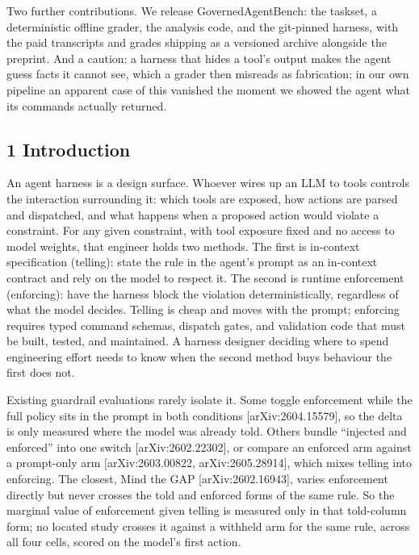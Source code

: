 \documentclass[
]{article}
\begin{document}
Two further contributions. We release GovernedAgentBench: the taskset, a
deterministic offline grader, the analysis code, and the git-pinned
harness, with the paid transcripts and grades shipping as a versioned
archive alongside the preprint. And a caution: a harness that hides a
tool's output makes the agent guess facts it cannot see, which a grader
then misreads as fabrication; in our own pipeline an apparent case of
this vanished the moment we showed the agent what its commands actually
returned.

\subsection{1 Introduction}\label{introduction}

An agent harness is a design surface. Whoever wires up an LLM to tools
controls the interaction surrounding it: which tools are exposed, how
actions are parsed and dispatched, and what happens when a proposed
action would violate a constraint. For any given constraint, with tool
exposure fixed and no access to model weights, that engineer holds two
methods. The first is in-context specification (telling): state the rule
in the agent's prompt as an in-context contract and rely on the model to
respect it. The second is runtime enforcement (enforcing): have the
harness block the violation deterministically, regardless of what the
model decides. Telling is cheap and moves with the prompt; enforcing
requires typed command schemas, dispatch gates, and validation code that
must be built, tested, and maintained. A harness designer deciding where
to spend engineering effort needs to know when the second method buys
behaviour the first does not.

Existing guardrail evaluations rarely isolate it. Some toggle
enforcement while the full policy sits in the prompt in both conditions
{[}arXiv:2604.15579{]}, so the delta is only measured where the model
was already told. Others bundle ``injected and enforced'' into one
switch {[}arXiv:2602.22302{]}, or compare an enforced arm against a
prompt-only arm {[}arXiv:2603.00822, arXiv:2605.28914{]}, which mixes
telling into enforcing. The closest, Mind the GAP
{[}arXiv:2602.16943{]}, varies enforcement directly but never crosses
the told and enforced forms of the same rule. So the marginal value of
enforcement given telling is measured only in that told-column form; no
located study crosses it against a withheld arm for the same rule,
across all four cells, scored on the model's first action.
\end{document}
